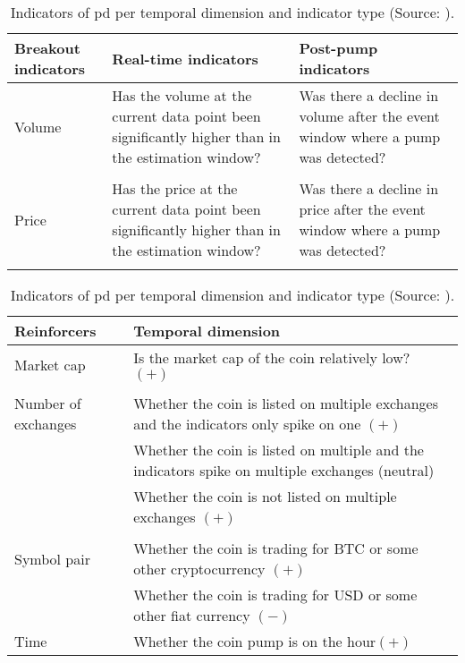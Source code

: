 \begin{table}
    \centering
    \begin{tabular}{p{} p{} p{}}
    \hline
    \textbf{Breakout indicators} &\textbf{Real-time indicators} & \textbf{Post-pump indicators}\\
    \hline
    Volume & Has the volume at the current data point been significantly higher than in the estimation window? & Was there a decline in volume after the event window where a pump was detected?\\\\
    Price & Has the price at the current data point been significantly higher than in the estimation window? & Was there a decline in price after the event window where a pump was detected?\\\\
    \end{tabular}
    
    \begin{tabular}{p{} p{}}
    \hline
    \textbf{Reinforcers} &\textbf{Temporal dimension}\\
    \hline
    Market cap & Is the market cap of the coin relatively low? $(+)$\\\\
    Number of exchanges & Whether the coin is listed on multiple exchanges and the indicators only spike on one $(+)$\\
                        & Whether the coin is listed on multiple and the indicators spike on multiple exchanges (neutral)\\
                        & Whether the coin is not listed on multiple exchanges $(+)$\\\\
    Symbol pair         & Whether the coin is trading for BTC or some other cryptocurrency $(+)$\\
                        & Whether the coin is trading for USD or some other fiat currency $(-)$\\
    Time                & Whether the coin pump is on the hour$(+)$\\
    \hline
    \end{tabular}
    \caption[\acf{pd} indicators]{Indicators of \ac{pd} per temporal dimension and indicator type (Source: \cite{P&D_to_the_moon, P&D_anatomy}).}
    \label{tab:pd_indicators}
\end{table}